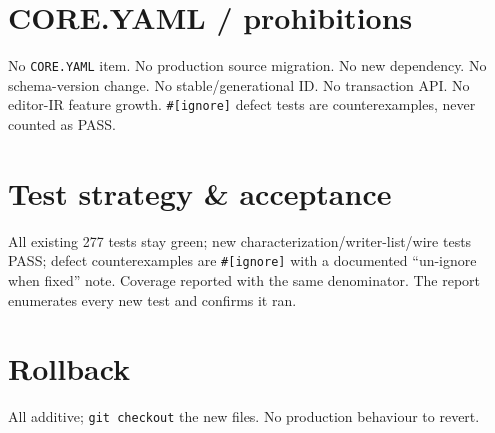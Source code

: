 \documentclass[11pt]{article}
\begin{document}
\section{CORE.YAML / prohibitions}
No \texttt{CORE.YAML} item. No production source migration. No new dependency. No
schema-version change. No stable/generational ID. No transaction API. No editor-IR
feature growth. \texttt{\#[ignore]} defect tests are counterexamples, never counted
as PASS.

\section{Test strategy \& acceptance}
All existing 277 tests stay green; new characterization/writer-list/wire tests
PASS; defect counterexamples are \texttt{\#[ignore]} with a documented ``un-ignore
when fixed'' note. Coverage reported with the same denominator. The report
enumerates every new test and confirms it ran.

\section{Rollback}
All additive; \texttt{git checkout} the new files. No production behaviour to
revert.
\end{document}
